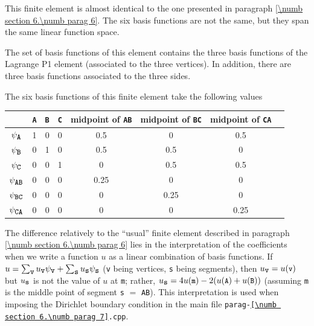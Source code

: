 This finite element is almost identical to the one presented in paragraph
\ref{\numb section 6.\numb parag 6}.
The six basis functions are not the same, but they span the same linear function space.

The set of basis functions of this element contains the three basis functions of the
Lagrange P1 element (associated to the three vertices).
In addition, there are three basis functions associated to the three sides.

The six basis functions of this finite element take the following values

\begin{center}\begin{tabular}{ | c || c | c | c | c | c | c | c | }
  \hline
  & {\small\tt A} & {\small\tt B} & {\small\tt C} & midpoint of {\small\tt AB} &
  midpoint of {\small\tt BC} & midpoint of {\small\tt CA}
  \\ \hline\hline
  $ \psi_{\mbox{\small\tt A}} $ & 1 & 0 & 0 & 0.5 & 0 & 0.5
  \\ \hline
  $ \psi_{\mbox{\small\tt B}} $ & 0 & 1 & 0 & 0.5 & 0.5 & 0
  \\ \hline
  $ \psi_{\mbox{\small\tt C}} $ & 0 & 0 & 1 & 0 & 0.5 & 0.5
  \\ \hline
  $ \psi_{\mbox{\small\tt AB}} $ & 0 & 0 & 0 & 0.25 & 0 & 0
  \\ \hline
  $ \psi_{\mbox{\small\tt BC}} $ & 0 & 0 & 0 & 0 & 0.25 & 0
  \\ \hline
  $ \psi_{\mbox{\small\tt CA}} $ & 0 & 0 & 0 & 0 & 0 & 0.25
  \\ \hline
\end{tabular}\end{center}

The difference relatively to the ``usual'' finite element described in paragraph
\ref{\numb section 6.\numb parag 6} lies in the interpretation
of the coefficients when we write a function $u$ as a linear combination of basis functions.
If $ u = \sum_{\mbox{\small\tt v}} u_{\mbox{\small\tt v}} \psi_{\mbox{\small\tt v}} +
\sum_{\mbox{\small\tt s}} u_{\mbox{\small\tt s}} \psi_{\mbox{\small\tt s}} $
({\small\tt v} being vertices, {\small\tt s} being segments), then $ u_{\mbox{\small\tt v}} =
u(\mbox{\small\tt v}) $ but $ u_{\mbox{\small\tt s}} $ is not the value of $u$ at {\small\tt m};
rather, $ u_{\mbox{\small\tt s}} = 4 u(\mbox{\small\tt m}) -2 (u(\mbox{\small\tt A}) +
u(\mbox{\small\tt B})) $ (assuming {\small\tt m} is the middle point of segment {\small\tt s}
$=$ {\small\tt AB}).
This interpretation is used when imposing the Dirichlet boundary condition in the main file
{\small\tt parag-\ref{\numb section 6.\numb parag 7}.cpp}.

